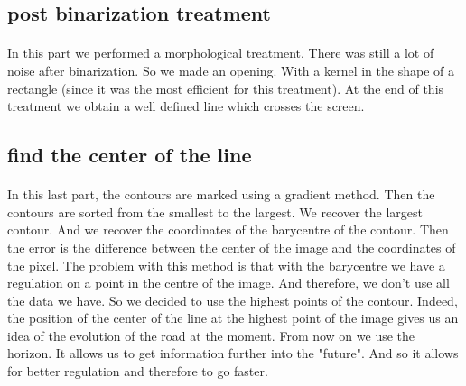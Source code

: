\subsection{post binarization treatment}
\paragraph{}
In this part we performed a morphological treatment. There was still a lot of noise after binarization. So we made an opening. 
With a kernel in the shape of a rectangle (since it was the most efficient for this treatment).
At the end of this treatment we obtain a well defined line which crosses the screen.

\subsection{find the center of the line}
\paragraph{}
In this last part, the contours are marked using a gradient method. Then the contours are sorted from the smallest to the largest.
We recover the largest contour.
And we recover the coordinates of the barycentre of the contour.
Then the error is the difference between the center of the image and the coordinates of the pixel.
The problem with this method is that with the barycentre we have a regulation on a point in the centre of the image. And therefore, we don't use all the data we have.
So we decided to use the highest points of the contour.
Indeed, the position of the center of the line at the highest point of the image gives us an idea of the evolution of the road at the moment. From now on we use the horizon. It allows us to get information further into the "future". And so it allows for better regulation and therefore to go faster.
